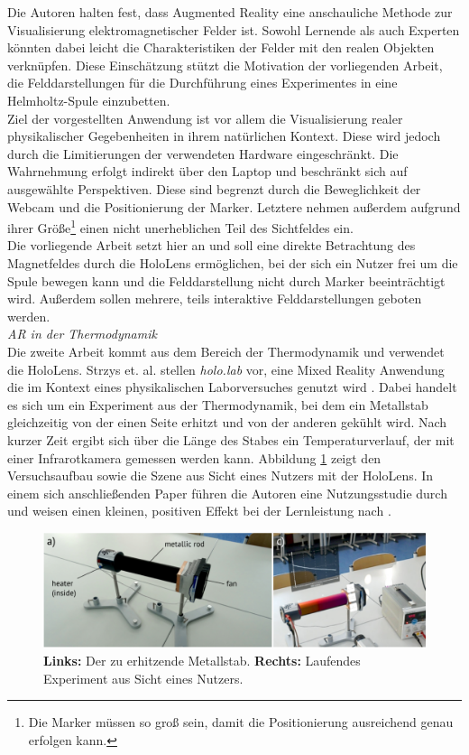 Die Autoren halten fest, dass Augmented Reality eine anschauliche Methode zur Visualisierung elektromagnetischer Felder ist. Sowohl Lernende als auch Experten könnten dabei leicht die Charakteristiken der Felder mit den realen Objekten verknüpfen. Diese Einschätzung stützt die Motivation der vorliegenden Arbeit, die Felddarstellungen für die Durchführung eines Experimentes in eine Helmholtz-Spule einzubetten.\\

Ziel der vorgestellten Anwendung ist vor allem die Visualisierung realer physikalischer Gegebenheiten in ihrem natürlichen Kontext. Diese wird jedoch durch die Limitierungen der verwendeten Hardware eingeschränkt. Die Wahrnehmung erfolgt indirekt über den Laptop und beschränkt sich auf ausgewählte Perspektiven. Diese sind begrenzt durch die Beweglichkeit der Webcam und die Positionierung der Marker. Letztere nehmen außerdem aufgrund ihrer Größe\footnote{Die Marker müssen so groß sein, damit die Positionierung ausreichend genau erfolgen kann.} einen nicht unerheblichen Teil des Sichtfeldes ein.\\

Die vorliegende Arbeit setzt hier an und soll eine direkte Betrachtung des Magnetfeldes durch die HoloLens ermöglichen, bei der sich ein Nutzer frei um die Spule bewegen kann und die Felddarstellung nicht durch Marker beeinträchtigt wird. Außerdem sollen mehrere, teils interaktive Felddarstellungen geboten werden.\\

\textit{AR in der Thermodynamik}\\
Die zweite Arbeit kommt aus dem Bereich der Thermodynamik und verwendet die HoloLens. Strzys et. al. stellen \textit{holo.lab} vor, eine Mixed Reality Anwendung die im Kontext eines physikalischen Laborversuches genutzt wird \cite{Strzys17}. Dabei handelt es sich um ein Experiment aus der Thermodynamik, bei dem ein Metallstab gleichzeitig von der einen Seite erhitzt und von der anderen gekühlt wird. Nach kurzer Zeit ergibt sich über die Länge des Stabes ein Temperaturverlauf, der mit einer Infrarotkamera gemessen werden kann. Abbildung \ref{img:Strzys17} zeigt den Versuchsaufbau sowie die Szene aus Sicht eines Nutzers mit der HoloLens. In einem sich anschließenden Paper führen die Autoren eine Nutzungsstudie durch und weisen einen kleinen, positiven Effekt bei der Lernleistung nach \cite{Strzys18}.\\

\begin{figure}[h!]
	\centering
	\includegraphics[width=1\textwidth]{images/papers/Strzys18.png}
	\caption{\textbf{Links:} Der zu erhitzende Metallstab.\textbf{ Rechts:} Laufendes Experiment aus Sicht eines Nutzers. \cite{Strzys17}}
	\label{img:Strzys17}
\end{figure}

